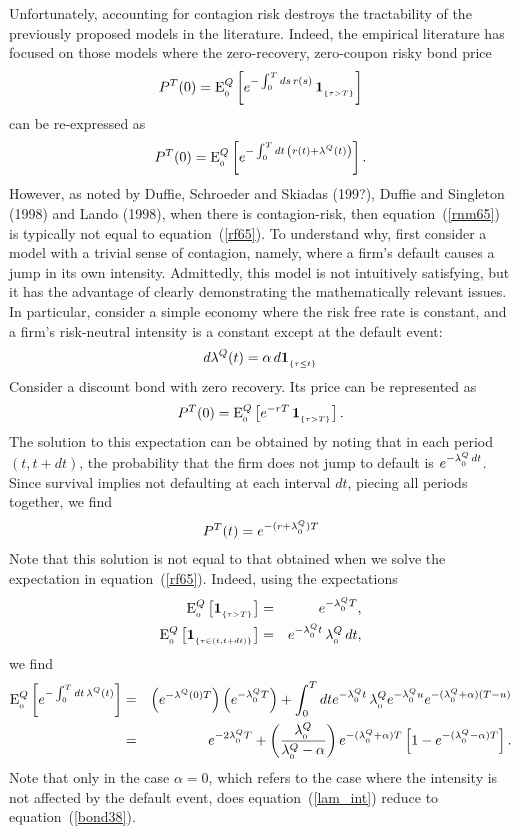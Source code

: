 \documentclass[titlepage,11pt]{article}
\def\by{\begin{eqnarray}}
\def\ey{\end{eqnarray}}
\def\nn{\nonumber}
\begin{document}
Unfortunately, accounting for contagion risk destroys the tractability of the previously
proposed models in the literature. Indeed, the empirical literature has focused on those models where
the zero-recovery, zero-coupon risky bond price
\by\label{rnm65}
P^{T}(0) = \mbox{E}^{Q}\sub{0} \left[ e^{-\int_{0}^{T} ds \, r(s)} \, \ind{\tau >  T} \right]
\ey
can be re-expressed as
\by\label{rf65}
P^{T}(0) = \mbox{E}^{Q}\sub{0} \left[ e^{-\int_{0}^{T} dt \, \left( r(t) + \lambda^{Q}(t) \right)}  \right].
\ey
However, as noted by Duffie, Schroeder and Skiadas (199?), Duffie and Singleton (1998) and Lando (1998),
when there is contagion-risk, then equation~(\ref{rnm65}) is typically not equal to equation~(\ref{rf65}).
To understand why, first consider a model with a trivial sense of contagion, namely, where
a firm's default causes a jump in its own intensity. Admittedly, this model is not
intuitively satisfying, but it has the advantage of clearly demonstrating the mathematically relevant issues.
In particular, consider a simple economy where the
risk free rate is constant, and a firm's risk-neutral intensity is a constant except at
the default event:
\by
d \lambda^{Q}(t) = \alpha \, d\ind{\tau\leq t}
\ey
Consider a discount bond with zero recovery.  Its price can be represented as
\by
P^{T}(0) = \mbox{E}^{Q}\sub{0} \left[ e^{-r T} \, \ind{\tau >  T} \right].
\ey
The solution to this expectation can be obtained by noting that in each period $(t, t + dt)$, the probability
that the firm does not jump to default is $e^{-\lambda^{Q}_{_{{0}}} \, dt}$.  Since survival implies
not defaulting at each interval $dt$, piecing all periods together, we
find
\by\label{bond38}
P^{T}(t) = e^{- (r + \lambda^{Q}\sub{0}) T}
\ey
Note that this solution is not equal to that obtained when we solve the expectation in equation~(\ref{rf65}).
Indeed, using the expectations
\by
\mbox{E}^{Q}\sub{0} \left[\ind{\tau >  T} \right] &=& e^{-\lambda^{Q}\sub{0} T}, \nn \\
%
\mbox{E}^{Q}\sub{0} \left[\ind{\tau  \in (t, t + dt)} \right] &=& e^{-\lambda^{Q}\sub{0} t} \, \lambda^{Q}\sub{0} \, dt,
\ey
we find
\by
\mbox{E}^{Q}\sub{0} \left[ e^{-\int_{0}^{T} dt \, \lambda^{Q}(t) }  \right] &=&
\left( e^{-\lambda^{Q}(0) T} \right) \left(e^{-\lambda^{Q}\sub{0} T} \right)
+ \int_{0}^{T} dt e^{-\lambda^{Q}\sub{0} t} \, \lambda^{Q}\sub{0}
e^{-\lambda^{Q}\sub{0} u} e^{- (\lambda^{Q}\sub{0}+ \alpha) (T-u)} \nn \\
%
&=& e^{-2\lambda^{Q}\sub{0} T}
+ \left( \frac{\lambda^{Q}\sub{0}}{\lambda^{Q}\sub{0} - \alpha }\right) e^{-(\lambda^{Q}\sub{0} + \alpha) T}
\left[ 1 - e^{-(\lambda^{Q}\sub{0} - \alpha) T} \right]. \label{lam_int}
\ey
Note that only in the case $\alpha = 0$, which refers to the case where the intensity is not
affected by the default event, does equation~(\ref{lam_int}) reduce to equation~(\ref{bond38}).
\end{document}
